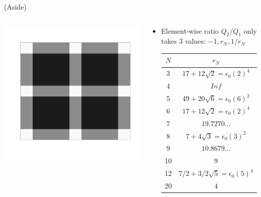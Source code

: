 \documentclass{beamer}
\newcommand{\I}{N}
\newcommand{\Q}{Q}
\begin{document}
\begin{frame}
  (Aside)
  \begin{columns}
    \begin{column}{.5\textwidth}
      \includegraphics[width=\textwidth]{fig8.png}
    \end{column}
    \begin{column}{.5\textwidth}
      \begin{itemize}
      \item Element-wise ratio $\Q_2/\Q_1$ only takes 3 values: $-1,r_{\I},1/r_{\I}$\\
        \begin{tabular}{c | c}
          $\I$ & $r_{\I}$\\
          \hline
          3 &  $17+12\sqrt{2} = \epsilon_0(2)^4$\\
          4 &  $Inf$\\
          5 &  $49+20\sqrt{6} = \epsilon_0(6)^2$\\
          6 &  $17+12\sqrt{2} = \epsilon_0(2)^4$\\%
          7 & $19.7270...$\\
          8 &  $7+4\sqrt{3} = \epsilon_0(3)^2$\\
          9 & $10.8679...$\\
          10 & $ 9$\\
          12 &  $7/2+3/2\sqrt{5} = \epsilon_0(5)^4$\\
          20 &  $4$\\
        \end{tabular}
      \end{itemize}
    \end{column}
  \end{columns}
\end{frame}
\end{document}
